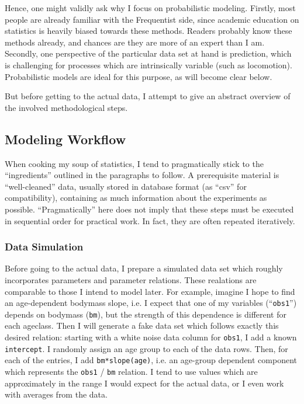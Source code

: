 Hence, one might validly ask why I focus on probabilistic modeling.
Firstly, most people are already familiar with the Frequentist side, since academic education on statistics is heavily biased towards these methods.
Readers probably know these methods already, and chances are they are more of an expert than I am.
Secondly, one perspective of the particular data set at hand is prediction, which is challenging for processes which are intrinsically variable (such as locomotion).
Probabilistic models are ideal for this purpose, as will become clear below.

But before getting to the actual data, I attempt to give an abstract overview of the involved methodological steps.

\clearpage
\subsection{Modeling Workflow}
\label{intro:workflow}
When cooking my soup of statistics, I tend to pragmatically stick to the ``ingredients'' outlined in the paragraphs to follow.
A prerequisite material is ``well-cleaned'' data, usually stored in database format (as ``csv'' for compatibility), containing as much information about the experiments as possible.
``Pragmatically'' here does not imply that these steps must be executed in sequential order for practical work.
In fact, they are often repeated iteratively.


\subsubsection{Data Simulation}
\label{sec:org2c774e4}
Before going to the actual data, I prepare a simulated data set which roughly incorporates parameters and parameter relations.
These realations are comparable to those I intend to model later.
For example, imagine I hope to find an age-dependent bodymass slope, i.e. I expect that one of my variables (``\texttt{obs1}'') depends on bodymass (\texttt{bm}), but the strength of this dependence is different for each ageclass.
Then I will generate a fake data set which follows exactly this desired relation: starting with a white noise data column for \texttt{obs1}, I add a known \texttt{intercept}.
I randomly assign an age group to each of the data rows.
Then, for each of the entries, I add \texttt{bm*slope(age)}, i.e. an age-group dependent component which represents the \texttt{obs1} / \texttt{bm} relation.
I tend to use values which are approximately in the range I would expect for the actual data, or I even work with averages from the data.

